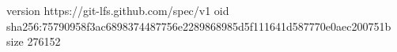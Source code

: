 version https://git-lfs.github.com/spec/v1
oid sha256:75790958f3ac6898374487756e2289868985d5f111641d587770e0aec200751b
size 276152
